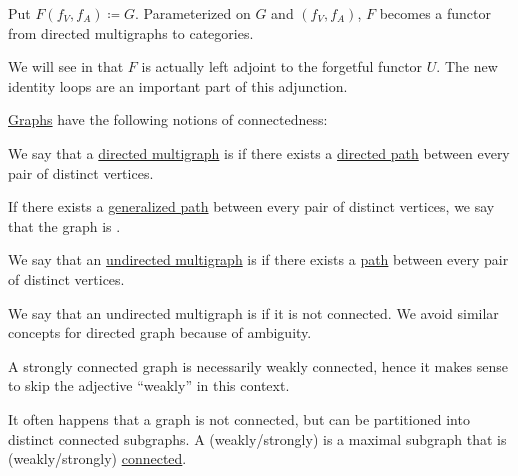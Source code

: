 \begin{definition}
  Put \( F(f_V, f_A) \coloneqq G \). Parameterized on \( G \) and \( (f_V, f_A) \), \( F \) becomes a functor from directed multigraphs to categories.
\end{definition}
\begin{comments}
  \item We will see in  that \( F \) is actually left adjoint to the forgetful functor \( U \). The new identity loops are an important part of this adjunction.
\end{comments}

\begin{definition}\label{def:graph_connectedness}
  \hyperref[rem:arbitrary_graph]{Graphs} have the following notions of connectedness:
  \begin{thmenum}
     We say that a \hyperref[def:directed_multigraph]{directed multigraph} is  if there exists a \hyperref[def:graph_walk/path]{directed path} between every pair of distinct vertices.

     If there exists a \hyperref[def:graph_walk/generalized]{generalized path} between every pair of distinct vertices, we say that the graph is .

     We say that an \hyperref[def:undirected_multigraph]{undirected multigraph} is  if there exists a \hyperref[def:graph_walk/undirected]{path} between every pair of distinct vertices.

    We say that an undirected multigraph is  if it is not connected. We avoid similar concepts for directed graph because of ambiguity.
  \end{thmenum}
\end{definition}
\begin{comments}
  \item A strongly connected graph is necessarily weakly connected, hence it makes sense to skip the adjective \enquote{weakly} in this context.
\end{comments}

\begin{definition}\label{def:graph_connected_component}
  It often happens that a graph is not connected, but can be partitioned into distinct connected subgraphs. A (weakly/strongly)  is a maximal subgraph that is (weakly/strongly) \hyperref[def:graph_connectedness]{connected}.
\end{definition}

